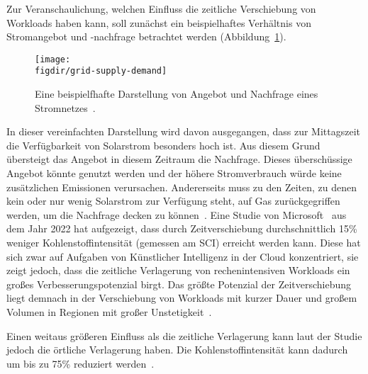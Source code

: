 Zur Veranschaulichung, welchen Einfluss die zeitliche Verschiebung von Workloads haben kann, soll zunächst ein beispielhaftes Verhältnis von Stromangebot und -nachfrage betrachtet werden (Abbildung~\ref{FIG:grid-supply-demand}).
\begin{figure}
 \caption{Eine beispielfhafte Darstellung von Angebot und Nachfrage eines Stromnetzes~\cite{Peixeiro.2022}.}
 {\texttt{[image: \\figdir/grid-supply-demand]}}
 \label{FIG:grid-supply-demand}
\end{figure}
In dieser vereinfachten Darstellung wird davon ausgegangen, dass zur Mittagszeit die Verfügbarkeit von Solarstrom besonders hoch ist.
Aus diesem Grund übersteigt das Angebot in diesem Zeitraum die Nachfrage.
Dieses überschüssige Angebot könnte genutzt werden und der höhere Stromverbrauch würde keine zusätzlichen Emissionen verursachen.
Andererseits muss zu den Zeiten, zu denen kein oder nur wenig Solarstrom zur Verfügung steht, auf Gas zurückgegriffen werden, um die Nachfrage decken zu können~\cite{Buchanan.2023}.
Eine Studie von Microsoft~\cite{Dodge.06212022} aus dem Jahr 2022 hat aufgezeigt, dass durch Zeitverschiebung durchschnittlich 15\% weniger Kohlenstoffintensität (gemessen am \ac{SCI}) erreicht werden kann.
Diese hat sich zwar auf Aufgaben von Künstlicher Intelligenz in der Cloud konzentriert, sie zeigt jedoch, dass die zeitliche Verlagerung von rechenintensiven Workloads ein großes Verbesserungspotenzial birgt.
Das größte Potenzial der Zeitverschiebung liegt demnach in der Verschiebung von Workloads mit kurzer Dauer und großem Volumen in Regionen mit großer Unstetigkeit~\cite{Buchanan.2023}.

Einen weitaus größeren Einfluss als die zeitliche Verlagerung kann laut der Studie jedoch die örtliche Verlagerung haben.
Die Kohlenstoffintensität kann dadurch um bis zu 75\% reduziert werden~\cite{Dodge.06212022}.

